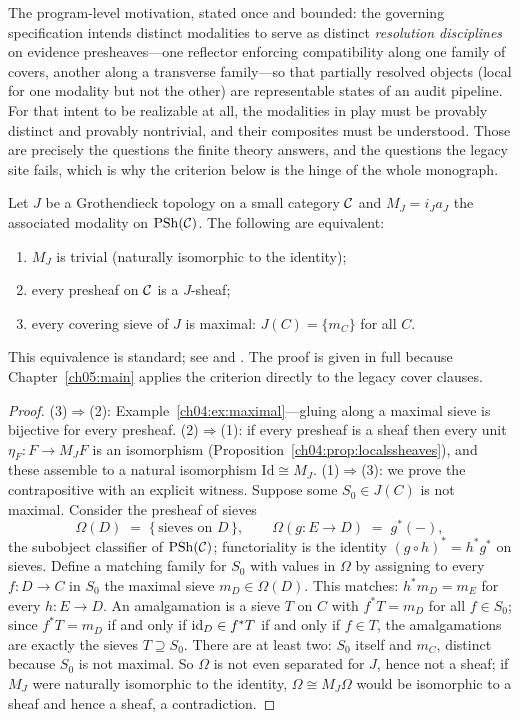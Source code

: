 The program-level motivation, stated once and bounded: the governing
specification intends distinct modalities to serve as distinct
\emph{resolution disciplines} on evidence presheaves---one reflector
enforcing compatibility along one family of covers, another along a
transverse family---so that partially resolved objects (local for one
modality but not the other) are representable states of an audit pipeline.
For that intent to be realizable at all, the modalities in play must be
provably distinct and provably nontrivial, and their composites must be
understood. Those are precisely the questions the finite theory answers, and
the questions the legacy site fails, which is why the criterion below is the
hinge of the whole monograph.

\begin{proposition}\label{ch04:prop:trivial}
Let $J$ be a Grothendieck topology on a small category $\mathcal{C}$ and
$M_J=i_Ja_J$ the associated modality on $\mathrm{PSh}(\mathcal{C})$. The following are
equivalent:
\begin{enumerate}
\item $M_J$ is trivial (naturally isomorphic to the identity);
\item every presheaf on $\mathcal{C}$ is a $J$-sheaf;
\item every covering sieve of $J$ is maximal: $J(C)=\{m_C\}$ for all $C$.
\end{enumerate}
This equivalence is standard; see \cite[Chap.~V]{maclane} and
\cite{johnstone}. The proof is given in full because
Chapter~\ref{ch05:main} applies the criterion directly to the legacy cover
clauses.
\end{proposition}

\begin{proof}
(3)$\Rightarrow$(2): Example~\ref{ch04:ex:maximal}---gluing along a maximal
sieve is bijective for every presheaf. (2)$\Rightarrow$(1): if every presheaf
is a sheaf then every unit $\eta_F:F\to M_JF$ is an isomorphism
(Proposition~\ref{ch04:prop:localssheaves}), and these assemble to a natural
isomorphism $\mathrm{Id}\cong M_J$. (1)$\Rightarrow$(3): we prove the
contrapositive with an explicit witness. Suppose some $S_0\in J(C)$ is not
maximal. Consider the presheaf of sieves
\[
\Omega(D)\;=\;\{\,\text{sieves on } D\,\},\qquad
\Omega(g:E\to D)\;=\;g^{*}(-),
\]
the subobject classifier of $\mathrm{PSh}(\mathcal{C})$; functoriality is the identity
$(g\circ h)^{*}=h^{*}g^{*}$ on sieves. Define a matching family for $S_0$
with values in $\Omega$ by assigning to every $f:D\to C$ in $S_0$ the maximal
sieve $m_D\in\Omega(D)$. This matches: $h^{*}m_D=m_E$ for every $h:E\to D$.
An amalgamation is a sieve $T$ on $C$ with $f^{*}T=m_D$ for all $f\in S_0$;
since $f^{*}T=m_D$ if and only if $\mathrm{id}_D\in f^{*}T$ if and only if $f\in T$,
the amalgamations are exactly the sieves $T\supseteq S_0$. There are at least
two: $S_0$ itself and $m_C$, distinct because $S_0$ is not maximal. So
$\Omega$ is not even separated for $J$, hence not a sheaf; if $M_J$ were
naturally isomorphic to the identity, $\Omega\cong M_J\Omega$ would be
isomorphic to a sheaf and hence a sheaf, a contradiction.
\end{proof}

